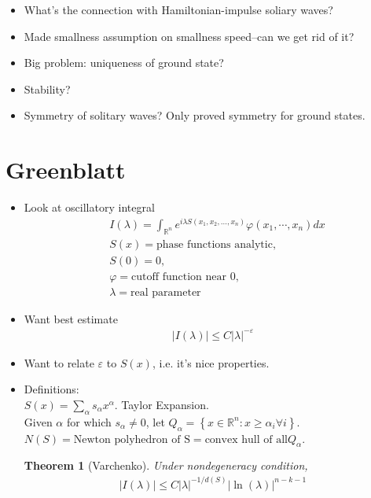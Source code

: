 \documentclass[12pt,reqno]{amsart}
\numberwithin{equation}{section}  %
\newcommand{\rr}{\mathbb{R}}
\newcommand{\ee}{\varepsilon}
\newcommand{\vp}{\varphi}
\newtheorem{theorem}{Theorem}[section]
\begin{document}
  \begin{itemize}
    \item{}
      What's the connection with Hamiltonian-impulse soliary waves?
    \item{}
      Made smallness assumption on smallness speed--can we get rid of it?
    \item{}
      Big problem: uniqueness of ground state?
    \item{}
      Stability?
    \item{}
      Symmetry of solitary waves? Only proved symmetry for ground states.
  \end{itemize}
\section{Greenblatt}
\begin{itemize}
\item{}
Look at oscillatory integral
\begin{equation*}
\begin{split}
& I(\lambda) = \int_{\rr^{n}} e^{i \lambda S(x_{1}, x_{2}, \ldots, x_{n})} \vp(x_{1}, \cdots, x_{n}) dx
\\
& S(x) = \text{phase functions analytic},
\\
& S(0) = 0, 
\\
& \vp = \text{cutoff function near 0}, 
\\
& \lambda=\text{real parameter}
\end{split}
\end{equation*}
\item{}
Want best estimate
\begin{gather*}
  | I(\lambda) | \le C| \lambda |^{-\ee}
\end{gather*}
\item{}
Want to relate $\ee$ to $S(x)$, i.e. it's nice properties.
\item Definitions:
\\
$S(x) = \sum_{\alpha} s_{\alpha} x^{\alpha}$. Taylor Expansion.
\\
Given $\alpha$ for which $s_{\alpha}\neq 0$, let $Q_\alpha = \left\{ x \in \rr^{n}: x \ge \alpha_{i} \forall i \right\}$.
\\
$N(S) = \text{Newton polyhedron of S}= \text{convex hull of all} Q_{\alpha}$.
  \begin{theorem}[Varchenko]
    Under nondegeneracy condition,
    \begin{gather*}
      | I(\lambda) | \le C| \lambda |^{-1/d(S)} | \ln(\lambda) |^{n-k-1}

\end{gather*}
\end{theorem}
\end{itemize}
\end{document}
